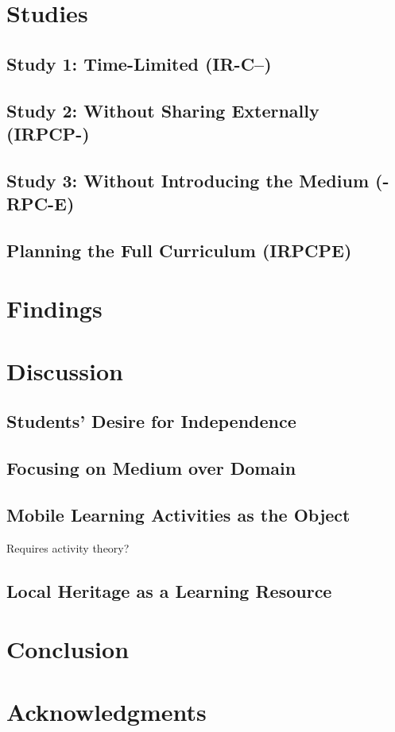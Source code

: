 \documentclass[,hyphens]{sigchi}
\begin{document}
\section{Studies}

\subsection{Study 1: Time-Limited (IR-C--)}

\subsection{Study 2: Without Sharing Externally (IRPCP-)}

\subsection{Study 3: Without Introducing the Medium (-RPC-E)}

\subsection{Planning the Full Curriculum (IRPCPE)}

\section{Findings}

\section{Discussion}

\subsection{Students' Desire for Independence}

\subsection{Focusing on Medium over Domain}

\subsection{Mobile Learning Activities as the Object}
Requires activity theory?

\subsection{Local Heritage as a Learning Resource}

\section{Conclusion}

\section{Acknowledgments}

\balance{}



\end{document}
